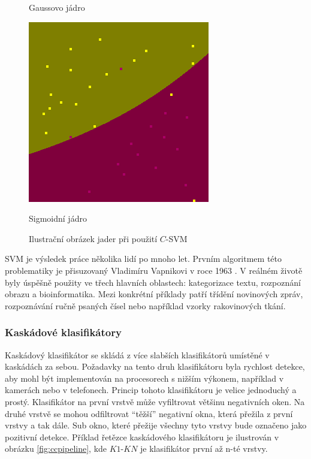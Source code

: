 \begin{figure}[ht]
\begin{minipage}[b]{0.5\linewidth}
    \caption*{Gaussovo jádro} 
    \vspace{4ex}
    \label{rbfKernel} 
  \end{minipage}%
  \begin{minipage}[b]{0.5\linewidth}
    \centering
    \includegraphics[width=.6\linewidth]{figures/sigm}
    \caption*{Sigmoidní jádro} 
    \vspace{4ex}
    \label{sigmKernel} 
  \end{minipage} 
  \caption{Ilustrační obrázek jader při použití $C$-SVM \cite{libsvm}}
  \label{kernels} 
\end{figure}

SVM je výsledek práce několika lidí po mnoho let. Prvním algoritmem této problematiky je přisuzovaný Vladimíru Vapnikovi v roce 1963 \cite{svm:vapnik}. V reálném životě byly úspěšně použity ve třech hlavních oblastech: kategorizace textu, rozpoznání obrazu a bioinformatika. Mezi konkrétní příklady patří třídění novinových zpráv, rozpoznávání ručně psaných čísel nebo například vzorky rakovinových tkání.

\subsubsection{Kaskádové klasifikátory}
Kaskádový klasifikátor se skládá z více slabších klasifikátorů umístěné v kaskádách za sebou. Požadavky na tento druh klasifikátoru byla rychlost detekce, aby mohl být implementován na procesorech s nižším výkonem, například v kamerách nebo v telefonech. Princip tohoto klasifikátoru je velice jednoduchý a prostý. Klasifikátor na první vrstvě může vyfiltrovat většinu negativních oken. Na druhé vrstvě se mohou odfiltrovat ``těžší'' negativní okna, která přežila z první vrstvy a tak dále. Sub okno, které přežije všechny tyto vrstvy bude označeno jako pozitivní detekce. Příklad řetězce kaskádového klasifikátoru je ilustrován v obrázku \ref{fig:ccpipeline}, kde $K1$-$KN$ je klasifikátor první až n-té vrstvy.

